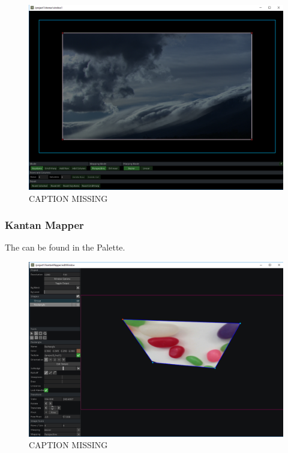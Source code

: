 \begin{figure}[H]
	\centering
	\includegraphics[width=\textwidth]{img/stoner.PNG}
	\caption[shortCaption]
	{CAPTION MISSING}
	\label{fig:label}
\end{figure}

\subsubsection{Kantan Mapper}
The  \COMP can be found in the Palette.


\begin{figure}[H]
	\centering
	\includegraphics[width=\textwidth]{img/kantanMapper.PNG}
	\caption[shortCaption]
	{CAPTION MISSING}
	\label{fig:label}
\end{figure}

